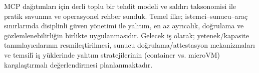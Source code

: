 MCP dağıtımları için derli toplu bir tehdit modeli ve saldırı taksonomisi ile pratik savunma ve operasyonel rehber sunduk. Temel ilke; istemci–sunucu–araç sınırlarında disiplinli güven yönetimi ile yalıtım, en az ayrıcalık, doğrulama ve gözlemlenebilirliğin birlikte uygulanmasıdır. Gelecek iş olarak; yetenek/kapasite tanımlayıcılarının resmileştirilmesi, sunucu doğrulama/attestasyon mekanizmaları ve temsilî iş yüklerinde yalıtım stratejilerinin (container vs. microVM) karşılaştırmalı değerlendirmesi planlanmaktadır.

